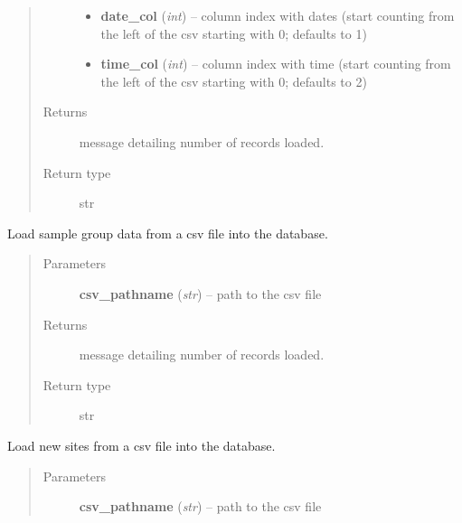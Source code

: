 \documentclass[letterpaper,10pt,english]{sphinxmanual}
\begin{document}
\begin{fulllineitems}
\begin{fulllineitems}
\begin{quote}
\begin{description}
\begin{itemize}
\item {} 
\textbf{date\_col} (\emph{int}) -- column index with dates (start counting from the left of the csv starting with 0; defaults to 1)

\item {} 
\textbf{time\_col} (\emph{int}) -- column index with time (start counting from the left of the csv starting with 0; defaults to 2)

\end{itemize}

\item[{Returns}] \leavevmode
message detailing number of records loaded.

\item[{Return type}] \leavevmode
str

\end{description}\end{quote}

\end{fulllineitems}


\begin{fulllineitems}
\label{modules:webb_utils.upload_data.UploadData.load_sample_group_data}
Load sample group data from a csv file into the database.
\begin{quote}\begin{description}
\item[{Parameters}] \leavevmode
\textbf{csv\_pathname} (\emph{str}) -- path to the csv file

\item[{Returns}] \leavevmode
message detailing number of records loaded.

\item[{Return type}] \leavevmode
str

\end{description}\end{quote}

\end{fulllineitems}


\begin{fulllineitems}
\label{modules:webb_utils.upload_data.UploadData.load_site_data}
Load new sites from a csv file into the database.
\begin{quote}\begin{description}
\item[{Parameters}] \leavevmode
\textbf{csv\_pathname} (\emph{str}) -- path to the csv file


\end{description}
\end{quote}
\end{fulllineitems}
\end{fulllineitems}
\end{document}
